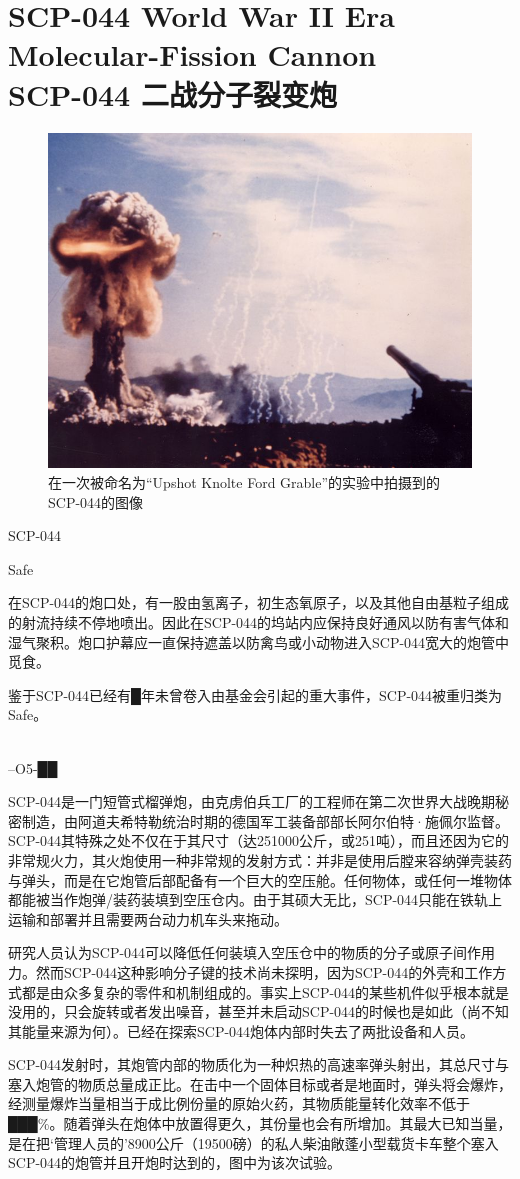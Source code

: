 \chapter[SCP-044 二战分子裂变炮]{
    SCP-044 World War II Era Molecular-Fission Cannon\\
    SCP-044 二战分子裂变炮
}

\label{chap:SCP-044}

\begin{figure}[H]
    \centering
    \includegraphics[width=0.5\linewidth]{images/SCP-044.jpg}
    \caption*{在一次被命名为“Upshot Knolte Ford Grable”的实验中拍摄到的SCP-044的图像}
\end{figure}

SCP-044

Safe

在SCP-044的炮口处，有一股由氢离子，初生态氧原子，以及其他自由基粒子组成的射流持续不停地喷出。因此在SCP-044的坞站内应保持良好通风以防有害气体和湿气聚积。炮口护幕应一直保持遮盖以防禽鸟或小动物进入SCP-044宽大的炮管中觅食。

鉴于SCP-044已经有█年未曾卷入由基金会引起的重大事件，SCP-044被重归类为Safe。

\\
–O5-██

SCP-044是一门短管式榴弹炮，由克虏伯兵工厂的工程师在第二次世界大战晚期秘密制造，由阿道夫希特勒统治时期的德国军工装备部部长阿尔伯特·施佩尔监督。SCP-044其特殊之处不仅在于其尺寸（达251000公斤，或251吨），而且还因为它的非常规火力，其火炮使用一种非常规的发射方式：并非是使用后膛来容纳弹壳装药与弹头，而是在它炮管后部配备有一个巨大的空压舱。任何物体，或任何一堆物体都能被当作炮弹\slash 装药装填到空压仓内。由于其硕大无比，SCP-044只能在铁轨上运输和部署并且需要两台动力机车头来拖动。

研究人员认为SCP-044可以降低任何装填入空压仓中的物质的分子或原子间作用力。然而SCP-044这种影响分子键的技术尚未探明，因为SCP-044的外壳和工作方式都是由众多复杂的零件和机制组成的。事实上SCP-044的某些机件似乎根本就是没用的，只会旋转或者发出噪音，甚至并未启动SCP-044的时候也是如此（尚不知其能量来源为何）。已经在探索SCP-044炮体内部时失去了两批设备和人员。

SCP-044发射时，其炮管内部的物质化为一种炽热的高速率弹头射出，其总尺寸与塞入炮管的物质总量成正比。在击中一个固体目标或者是地面时，弹头将会爆炸，经测量爆炸当量相当于成比例份量的原始火药，其物质能量转化效率不低于███\%。随着弹头在炮体中放置得更久，其份量也会有所增加。其最大已知当量，是在把‘管理人员的’8900公斤（19500磅）的私人柴油敞蓬小型载货卡车整个塞入SCP-044的炮管并且开炮时达到的，图中为该次试验。
